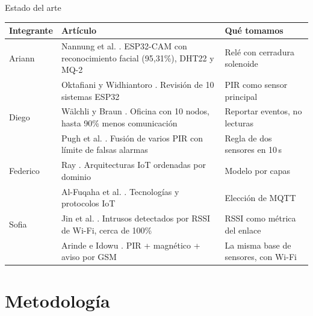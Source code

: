 \documentclass[aspectratio=169,10pt]{beamer}
\begin{document}
\begin{frame}{Estado del arte}
  \footnotesize
  \renewcommand{\arraystretch}{1.15}
  \begin{tabular}{@{}l>{\raggedright\arraybackslash}p{7.2cm}>{\raggedright\arraybackslash}p{4.9cm}@{}}
    \toprule
    \textbf{Integrante} & \textbf{Artículo} & \textbf{Qué tomamos} \\
    \midrule
    Ariann & Nannung et al. \cite{nannung2025iot}. ESP32-CAM con reconocimiento facial (95,31\%), DHT22 y MQ-2 & Relé con cerradura solenoide \\
     & Oktafiani y Widhiantoro \cite{oktafiani2025esp32}. Revisión de 10 sistemas ESP32 & PIR como sensor principal \\
    \midrule
    Diego & Wälchli y Braun \cite{walchli2009building}. Oficina con 10 nodos, hasta 90\% menos comunicación & Reportar eventos, no lecturas \\
     & Pugh et al. \cite{pugh2015fusion}. Fusión de varios PIR con límite de falsas alarmas & Regla de dos sensores en 10\,s \\
    \midrule
    Federico & Ray \cite{ray2018survey}. Arquitecturas IoT ordenadas por dominio & Modelo por capas \\
     & Al-Fuqaha et al. \cite{alfuqaha2015survey}. Tecnologías y protocolos IoT & Elección de MQTT \\
    \midrule
    Sofia & Jin et al. \cite{jin2018wlid}. Intrusos detectados por RSSI de Wi-Fi, cerca de 100\% & RSSI como métrica del enlace \\
     & Arinde e Idowu \cite{arinde2024multisensor}. PIR + magnético + aviso por GSM & La misma base de sensores, con Wi-Fi \\
    \bottomrule
  \end{tabular}
\end{frame}

\section{Metodología}
\end{document}
